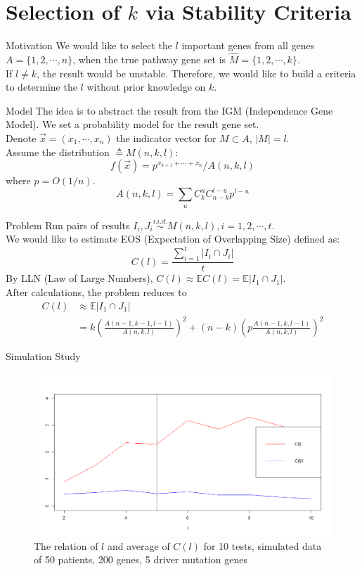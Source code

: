 \documentclass[xcolor=dvipsnames]{beamer}
\begin{document}
\section{Selection of $k$ via Stability Criteria}
\begin{frame}{Motivation}
We would like to select the $l$ important genes from all genes $A=\{1,2,\cdots,n\}$, when the true pathway gene set is $\hat{M}=\{1,2,\cdots,k\}$.\\
If $l\neq k$, the result would be unstable. Therefore, we would like to build a criteria to determine the $l$ without prior knowledge on $k$.
\end{frame}
\begin{frame}{Model}
The idea is to abstract the result from the IGM (Independence Gene Model). We set a probability model for the result gene set.\\
Denote $\vec{x}=(x_1,\cdots,x_n)$ the indicator vector for $M\subset A$, $|M|=l$.\\
Assume the distribution $\triangleq M(n,k,l)$:
\[
f(\vec{x})=p^{x_{k+1}+\cdots +x_n}/A(n,k,l)
\]
where $p=O(1/n)$.\\
\[
A(n,k,l)=\sum_{u}C_k^uC_{n-k}^{l-u}p^{l-u}
\]
\end{frame}
\begin{frame}{Problem}
Run pairs of results $I_i,J_i\stackrel{i.i.d.}{\sim} M(n,k,l), i=1,2,\cdots, t$.\\
We would like to estimate EOS (Expectation of Overlapping Size) defined as:
\[C(l)=\frac{\sum_{i=1}^t|I_i\cap J_i|}{t}\]
By LLN (Law of Large Numbers), $C(l)\approx\mathbb{E}C(l)=\mathbb{E}|I_1\cap J_1|.$\\
After calculations, the problem reduces to\\
\begin{displaymath}
\begin{split}
C(l)&\approx \mathbb{E}|I_1\cap J_1|\\
&=k(\frac{A(n-1,k-1,l-1)}{A(n,k,l)})^2+(n-k)(p\frac{A(n-1,k,l-1)}{A(n,k,l)})^2
\end{split}
\end{displaymath}
\end{frame}
\begin{frame}{Simulation Study}
\begin{figure}
\centering
\includegraphics[width=0.9\linewidth]{overlapcrit.png}
\caption{The relation of $l$ and average of $C(l)$ for 10 tests, simulated data of 50 patients, 200 genes, 5 driver mutation genes}
\end{figure}
\end{frame}
\end{document}
